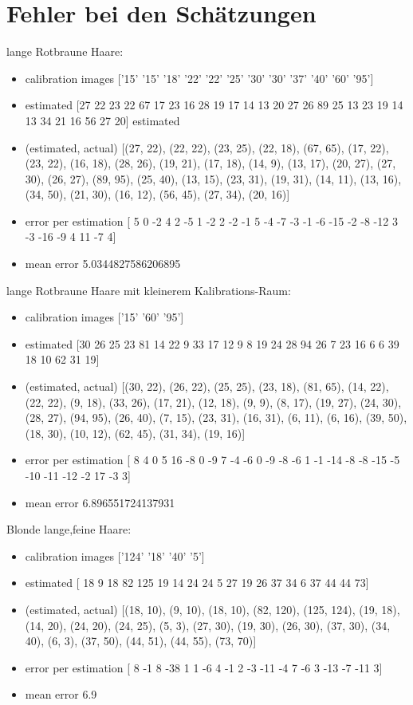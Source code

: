 \documentclass[german,a4paper, 12pt]{llncs}
\begin{document}
\section{Fehler bei den Schätzungen}
\label{appendix:Error}

lange Rotbraune Haare:

\begin{itemize}
	\item calibration images ['15' '15' '18' '22' '22' '25' '30' '30' '37' '40' '60' '95']
	\item estimated [27 22 23 22 67 17 23 16 28 19 17 14 13 20 27 26 89 25 13 23 19 14 13 34 
	21 16 56 27 20] estimated
	\item (estimated, actual)
	[(27, 22), (22, 22), (23, 25), (22, 18), (67, 65), (17, 22), (23, 22), (16, 18), (28, 26), (19, 21), (17, 18), (14, 9), (13, 17), (20, 27), (27, 30), (26, 27), (89, 95), (25, 40), (13, 15), (23, 31), (19, 31), (14, 11), (13, 16), (34, 50), (21, 30), (16, 12), (56, 45), (27, 34), (20, 16)]
	\item error per estimation [  5   0  -2   4   2  -5   1  -2   2  -2  -1   5  -4  -7  -3  -1  -6 -15
	-2  -8 -12   3  -3 -16  -9   4  11  -7   4]
	\item mean error 5.0344827586206895
\end{itemize}

lange Rotbraune Haare mit kleinerem Kalibrations-Raum:

\begin{itemize}
	\item calibration images ['15' '60' '95']
	\item estimated [30 26 25 23 81 14 22  9 33 17 12  9  8 19 24 28 94 26  7 23 16  6  6 39
	18 10 62 31 19] 
	\item (estimated, actual)
	[(30, 22), (26, 22), (25, 25), (23, 18), (81, 65), (14, 22), (22, 22), (9, 18), (33, 26), (17, 21), (12, 18), (9, 9), (8, 17), (19, 27), (24, 30), (28, 27), (94, 95), (26, 40), (7, 15), (23, 31), (16, 31), (6, 11), (6, 16), (39, 50), (18, 30), (10, 12), (62, 45), (31, 34), (19, 16)]
	\item error per estimation [  8   4   0   5  16  -8   0  -9   7  -4  -6   0  -9  -8  -6   1  -1 -14
	-8  -8 -15  -5 -10 -11 -12  -2  17  -3   3]
	\item mean error 6.896551724137931
\end{itemize}

Blonde lange,feine Haare:
\begin{itemize}
	\item calibration images ['124' '18' '40' '5']
	\item estimated [ 18   9  18  82 125  19  14  24  24   5  27  19  26  37  34   6  37  44
	44  73]
	\item (estimated, actual)
	[(18, 10), (9, 10), (18, 10), (82, 120), (125, 124), (19, 18), (14, 20), (24, 20), (24, 25), (5, 3), (27, 30), (19, 30), (26, 30), (37, 30), (34, 40), (6, 3), (37, 50), (44, 51), (44, 55), (73, 70)]
	\item error per estimation [  8  -1   8 -38   1   1  -6   4  -1   2  -3 -11  -4   7  -6   3 -13  -7
	-11   3]
	\item mean error 6.9
\end{itemize}
\end{document}
